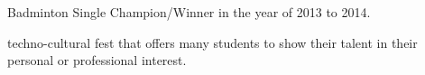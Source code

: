 \documentclass[]{deedy-resume-reversed}
\begin{document}
\begin{minipage}[t]{0.60\textwidth}
\begin{tightemize}
\item Badminton Single Champion/Winner in the year of 2013 to 2014.\\
\end{tightemize}
\sectionsep




\begin{tightemize}
\item techno-cultural fest that offers many students to show their talent in their personal or professional interest.
\end{tightemize}

\sectionsep






\end{minipage}
\end{document}
